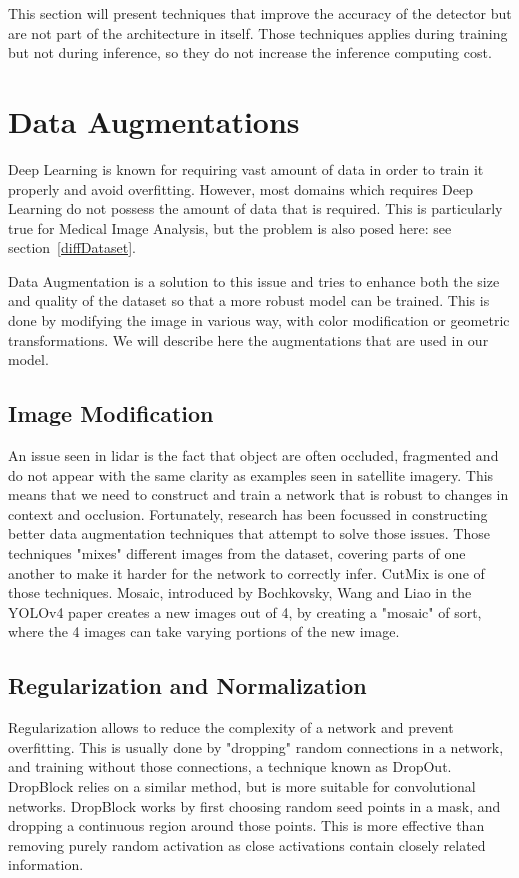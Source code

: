 This section will present techniques that improve the accuracy of the detector but are not part of the architecture in itself. Those techniques applies during training but not during inference, so they do not increase the inference computing cost.
\section{Data Augmentations}
Deep Learning is known for requiring vast amount of data in order to train it properly and avoid \gls{overfitting}\cite{shorten2019}. However, most domains which requires Deep Learning do not possess the amount of data that is required. This is particularly true for Medical Image Analysis, but the problem is also posed here: see section~\ref{diffDataset}.  

Data Augmentation is a solution to this issue and tries to enhance both the size and quality of the dataset so that a more robust model can be trained. This is done by modifying the image in various way, with color modification or geometric transformations. We will describe here the augmentations that are used in our model.

\subsection{Image Modification}
An issue seen in \gls{lidar} is the fact that object are often occluded, fragmented and do not appear with the same clarity as examples seen in satellite imagery. This means that we need to construct and train a network that is robust to changes in context and occlusion. Fortunately, research has been focussed in constructing better data augmentation techniques that attempt to solve those issues. Those techniques "mixes" different images from the dataset, covering parts of one another to make it harder for the network to correctly infer. CutMix\cite{cutMix} is one of those techniques. Mosaic, introduced by Bochkovsky, Wang and Liao in the YOLOv4 paper\cite{yolov4} creates a new images out of 4, by creating a "mosaic" of sort, where the 4 images can take varying portions of the new image. 


\subsection{Regularization and Normalization}
Regularization allows to reduce the complexity of a network and prevent overfitting. This is usually done by "dropping" random connections in a network, and training without those connections, a technique known as DropOut\cite{dropOut}. DropBlock\cite{dropBlock} relies on a similar method, but is more suitable for convolutional networks. DropBlock works by first choosing random seed points in a mask, and dropping a continuous region around those points. This is more effective than removing purely random activation as close activations contain closely related information.

